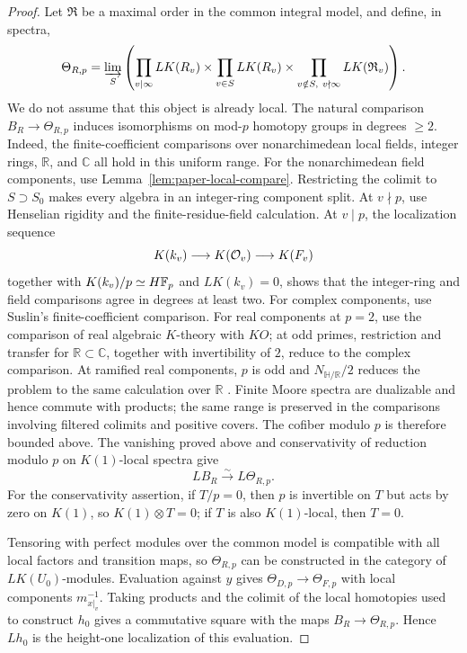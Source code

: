 \begin{proof}
Let $\mathfrak R$ be a maximal order in the common integral model, and define, in spectra,
\[
 \Theta_{R,p}=\varinjlim_S\left(
 \prod_{v\mid\infty}LK(R_v)\times\prod_{v\in S}LK(R_v)
 \times\prod_{v\notin S,\ v\nmid\infty}LK(\mathfrak R_v)\right).
\]
We do not assume that this object is already local.
The natural comparison $B_R\to \Theta_{R,p}$ induces isomorphisms on mod-$p$ homotopy groups in degrees $\ge2$.
Indeed, the finite-coefficient comparisons over nonarchimedean local fields, integer rings, $\mathbb R$, and $\mathbb C$ all hold in this uniform range.
For the nonarchimedean field components, use Lemma~\ref{lem:paper-local-compare}.
Restricting the colimit to $S\supset S_0$ makes every algebra in an integer-ring component split.
At $v\nmid p$, use Henselian rigidity and the finite-residue-field calculation.
At $v\mid p$, the localization sequence
\[
 K(k_v)\longrightarrow K(\mathcal O_v)\longrightarrow K(F_v)
\]
together with $K(k_v)/p\simeq H\mathbb F_p$ and $LK(k_v)=0$, shows that the integer-ring and field comparisons agree in degrees at least two.
For complex components, use Suslin's finite-coefficient comparison.
For real components at $p=2$, use the comparison of real algebraic $K$-theory with $KO$; at odd primes, restriction and transfer for $\mathbb R\subset\mathbb C$, together with invertibility of $2$, reduce to the complex comparison.
At ramified real components, $p$ is odd and $N_{\mathbb H/\mathbb R}/2$ reduces the problem to the same calculation over $\mathbb R$ \cite{QuillenFinite,ClausenMathewMorrow,SuslinClosed,KaroubiWeibelReal}.
Finite Moore spectra are dualizable and hence commute with products; the same range is preserved in the comparisons involving filtered colimits and positive covers.
The cofiber modulo $p$ is therefore bounded above.
The vanishing proved above and conservativity of reduction modulo $p$ on $K(1)$-local spectra give
\[
 LB_R\xrightarrow{\sim}L\Theta_{R,p}.
\]
For the conservativity assertion, if $T/p=0$, then $p$ is invertible on $T$ but acts by zero on $K(1)$, so $K(1)\otimes T=0$; if $T$ is also $K(1)$-local, then $T=0$.

Tensoring with perfect modules over the common model is compatible with all local factors and transition maps, so $\Theta_{R,p}$ can be constructed in the category of $LK(U_0)$-modules.
Evaluation against $y$ gives $\Theta_{D,p}\to\Theta_{F,p}$ with local components $m_{x|_v}^{-1}$.
Taking products and the colimit of the local homotopies used to construct $h_0$ gives a commutative square with the maps $B_R\to\Theta_{R,p}$.
Hence $Lh_0$ is the height-one localization of this evaluation.


\end{proof}
